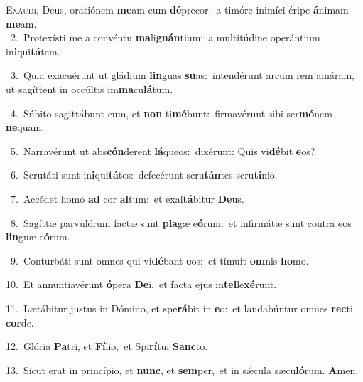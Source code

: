 \lettrine{\initial\textcolor{\initialcolor}{E}}{xáudi,} Deus, oratiónem \textbf{me}\-am cum \textbf{dé}\-precor:~\star a timóre inimíci éripe \textbf{á}\-nimam \textbf{me}\-am.\\
{\numbfont\textcolor{\numbcolor}{~2.}}~Protexísti me a convéntu \textbf{ma}\-li\-\textbf{gnán}\-tium:~\star a multitúdine operántium in\-\textbf{i}\-qui\-\textbf{tá}\-tem.\par
{\numbfont\textcolor{\numbcolor}{~3.}}~Quia exacuérunt ut gládium \textbf{lin}\-guas \textbf{su}\-as:~\star intendérunt arcum rem amáram, ut sagíttent in occúltis im\-\textbf{ma}\-cu\-\textbf{lá}\-tum.\par
{\numbfont\textcolor{\numbcolor}{~4.}}~Súbito sagittábunt eum, et \textbf{non} ti\-\textbf{mé}\-bunt:~\star firmavérunt sibi ser\-\textbf{mó}\-nem \textbf{ne}\-quam.\par
{\numbfont\textcolor{\numbcolor}{~5.}}~Narravérunt ut abs\-\textbf{cón}\-derent \textbf{lá}\-queos:~\star dixérunt: Quis vi\-\textbf{dé}\-bit \textbf{e}\-os?\par
{\numbfont\textcolor{\numbcolor}{~6.}}~Scrutáti sunt in\-\textbf{i}\-qui\-\textbf{tá}\-tes:~\star defecérunt scru\-\textbf{tán}\-tes scru\-\textbf{tí}\-nio.\par
{\numbfont\textcolor{\numbcolor}{~7.}}~Accédet homo \textbf{ad} cor \textbf{al}\-tum:~\star et exal\-\textbf{tá}\-bitur \textbf{De}\-us.\par
{\numbfont\textcolor{\numbcolor}{~8.}}~Sagíttæ parvulórum factæ sunt \textbf{pla}\-gæ e\-\textbf{ó}\-rum:~\star et infirmátæ sunt contra eos \textbf{lin}\-guæ e\-\textbf{ó}\-rum.\par
{\numbfont\textcolor{\numbcolor}{~9.}}~Conturbáti sunt omnes qui vi\-\textbf{dé}\-bant \textbf{e}\-os:~\star et tímuit \textbf{om}\-nis \textbf{ho}\-mo.\par
{\numbfont\textcolor{\numbcolor}{10.}}~Et annuntiavérunt \textbf{ó}\-pera \textbf{De}\-i,~\star et facta ejus in\-\textbf{tel}\-le\-\textbf{xé}\-runt.\par
{\numbfont\textcolor{\numbcolor}{11.}}~Lætábitur justus in Dómino, et spe\-\textbf{rá}\-bit in \textbf{e}\-o:~\star et laudabúntur omnes \textbf{rec}\-ti \textbf{cor}\-de.\par
{\numbfont\textcolor{\numbcolor}{12.}}~Glória \textbf{Pa}\-tri, et \textbf{Fí}\-lio,~\star et Spi\-\textbf{rí}\-tui \textbf{Sanc}\-to.\par
{\numbfont\textcolor{\numbcolor}{13.}}~Sicut erat in princípio, et \textbf{nunc}\-, et \textbf{sem}\-per,~\star et in sǽcula sæcu\-\textbf{ló}\-rum. \textbf{A}\-men.\par
